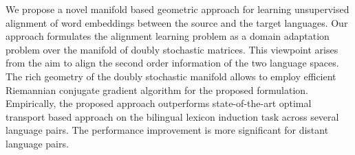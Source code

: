 We propose a novel manifold based geometric approach for learning unsupervised alignment of word embeddings between the source and the target languages. Our approach formulates the alignment learning problem as a domain adaptation problem over the manifold of doubly stochastic matrices. This viewpoint arises from the aim to align the second order information of the two language spaces. The rich geometry of the doubly stochastic manifold allows to employ efficient Riemannian conjugate gradient algorithm for the proposed formulation. Empirically, the proposed approach outperforms state-of-the-art optimal transport based approach on the bilingual lexicon induction task across several language pairs. The performance improvement is more significant for distant language pairs.

